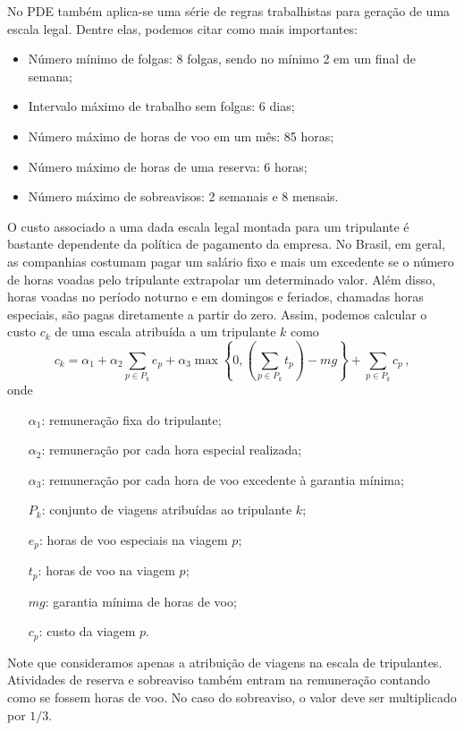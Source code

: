 \documentclass[12pt,a4paper]{article}
\newcommand{\ev}{\, ,}                                       %
\begin{document}
No PDE também aplica-se uma série de regras trabalhistas para geração de uma escala legal. Dentre 
elas, podemos citar como mais importantes:

\begin{itemize}
	\item Número mínimo de folgas: 8 folgas, sendo no mínimo 2 em um final de semana;
	\item Intervalo máximo de trabalho sem folgas: 6 dias;
	\item Número máximo de horas de voo em um mês: 85 horas;
	\item Número máximo de horas de uma reserva: 6 horas;
	\item Número máximo de sobreavisos: 2 semanais e 8 mensais.
\end{itemize}

O custo associado a uma dada escala legal montada para um tripulante é bastante dependente da
política de pagamento da empresa. No Brasil, em geral, as companhias costumam pagar um salário fixo
e mais um excedente se o número de horas voadas pelo tripulante extrapolar um determinado valor.
Além disso, horas voadas no período noturno e em domingos e feriados, chamadas horas especiais, são
pagas diretamente a partir do zero. Assim, podemos calcular o custo $c_k$ de uma escala atribuída 
a um tripulante $k$ como
%
\begin{equation}
c_k = \alpha_1 + \alpha_2 \sum_{p \in P_k} e_p 
	+ \alpha_3 \max\left\{0, \left(\sum_{p \in P_k} t_p\right) - mg\right\}
	+ \sum_{p \in P_k} c_p \ev
\end{equation}
%
onde
%
\begin{itemize}
	\item[$\alpha_1$:] remuneração fixa do tripulante;
	\item[$\alpha_2$:] remuneração por cada hora especial realizada;
	\item[$\alpha_3$:] remuneração por cada hora de voo excedente à garantia mínima;
	\item[$P_k$:] conjunto de viagens atribuídas ao tripulante $k$;	
	\item[$e_p$:] horas de voo especiais na viagem $p$;
	\item[$t_p$:] horas de voo na viagem $p$;
	\item[$mg$:] garantia mínima de horas de voo;
	\item[$c_p$:] custo da viagem $p$.
\end{itemize}
%
Note que consideramos apenas a atribuição de viagens na escala de tripulantes. Atividades de reserva
e sobreaviso também entram na remuneração contando como se fossem horas de voo. No caso do
sobreaviso, o valor deve ser multiplicado por $1/3$.
\end{document}
